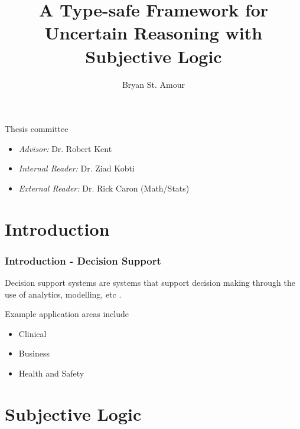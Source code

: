 \documentclass{beamer}
\title{A Type-safe Framework for Uncertain Reasoning with Subjective Logic}
\author{Bryan St. Amour}
\begin{document}
\begin{frame}
\titlepage
\end{frame}

\begin{frame}

Thesis committee

\begin{itemize}
  \item \emph{Advisor:} Dr. Robert Kent
  \item \emph{Internal Reader:} Dr. Ziad Kobti
  \item \emph{External Reader:} Dr. Rick Caron (Math/Stats)
\end{itemize}

\end{frame}

\begin{frame}
\tableofcontents
\end{frame}


\section{Introduction}

\begin{frame}
\frametitle{Introduction - Decision Support}

Decision support systems are systems that support decision making
through the use of analytics, modelling, etc \cite{sprague_framework_1980}.

Example application areas include

\begin{itemize}
  \item Clinical \cite{berner2007clinical}
  \item Business \cite{klein_knowledge-based}
  \item Health and Safety \cite{kent2010application}
\end{itemize}

\end{frame}


\section{Subjective Logic}
\end{document}
